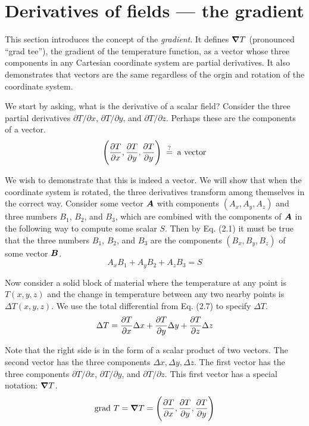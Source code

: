 \section{Derivatives of fields --- the gradient}

This section introduces the concept of the \emph{gradient}.
It defines $\boldsymbol{\nabla} T$ (pronounced ``grad tee''), the gradient of the temperature function,
as a vector whose three components in any Cartesian coordinate system are partial derivatives.
It also demonstrates that vectors are the same regardless of the orgin and rotation of the 
coordinate system.

We start by asking, what is the derivative of a scalar field?
Consider the three partial derivatives 
$\partial T/ \partial x$, $\partial T/ \partial y$, and $\partial T/ \partial z$.
Perhaps these are the components of a vector.
\begin{equation}
  \Bigg( \frac{\partial T}{\partial x} , \frac{\partial T}{\partial y} , \frac{\partial T}{\partial y} \Bigg)
  \; \stackrel{?}{=} \; \mathrm{a\ vector}
\end{equation}

We wish to demonstrate that this is indeed a vector.
We will show that when the coordinate system is rotated,
the three derivatives transform among themselves in the correct way.
Consider some vector $\boldsymbol{A}$ with components $(A_x,A_y,A_z)$
and three numbers $B_1$, $B_2$, and $B_3$,
which are combined with the components of $\boldsymbol{A}$ in the following way
to compute some scalar $S$.
Then by Eq. (2.1) it must be true that the three numbers $B_1$, $B_2$, and $B_3$
are the components $(B_x,B_y,B_z)$ of some vector $\boldsymbol{B}$.
\begin{equation}
  A_x B_1  +  A_y B_2  + A_z B_3 = S
\end{equation}

Now consider a solid block of material where the temperature at any point is $T(x,y,z)$
and the change in temperature between any two nearby points is $\Delta T(x,y,z)$.
We use the total differential from Eq. (2.7) to specify $\Delta T$.
\begin{equation}
  \Delta T  =  \frac{\partial T}{\partial x} \Delta x  +  \frac{\partial T}{\partial y} \Delta y  +  \frac{\partial T}{\partial z} \Delta z 
\end{equation}

Note that the right side is in the form of a scalar product of two vectors.
The second vector has the three components $\Delta x, \Delta y, \Delta z$.
The first vector has the three components
$\partial T/ \partial x$, $\partial T/ \partial y$, and $\partial T/ \partial z$.
This first vector has a special notation: $\boldsymbol{\nabla} T$.
\begin{equation}
  \mathrm{grad\ } T = \boldsymbol{\nabla} T = \Bigg( \frac{\partial T}{\partial x} , \frac{\partial T}{\partial y} , \frac{\partial T}{\partial y} \Bigg)
\end{equation}

